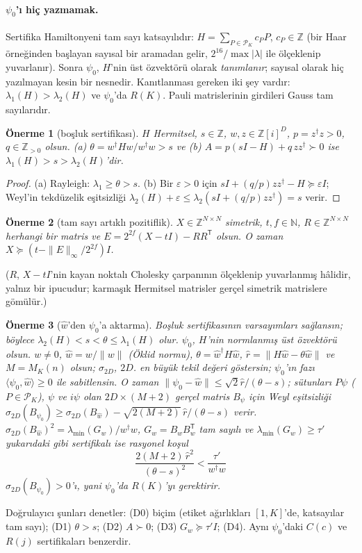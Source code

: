 \documentclass[aps,pra,onecolumn,superscriptaddress,nofootinbib,longbibliography,10pt]{revtex4-2}
\newtheorem{proposition}{Önerme}[section]
\theoremstyle{definition}
\newcommand{\ZZ}{\mathbb Z}
\begin{document}
\paragraph*{$\psi_0$'ı hiç yazmamak.} Sertifika Hamiltonyeni tam sayı katsayılıdır: $H=\sum_{P\in\mathcal P_K}c_PP$, $c_P\in\ZZ$ (bir Haar örneğinden başlayan sayısal bir aramadan gelir, $2^{16}/\max|\lambda|$ ile ölçeklenip yuvarlanır). Sonra $\psi_0$, $H$'nin üst özvektörü olarak \emph{tanımlanır}; sayısal olarak hiç yazılmayan kesin bir nesnedir. Kanıtlanması gereken iki şey vardır: $\lambda_1(H)>\lambda_2(H)$ ve $\psi_0$'da $R(K)$. Pauli matrislerinin girdileri Gauss tam sayılarıdır.

\begin{proposition}[boşluk sertifikası]
$H$ Hermitsel, $s\in\ZZ$, $w,z\in\ZZ[i]^D$, $p=z^\dagger z>0$, $q\in\ZZ_{>0}$ olsun. (a) $\theta=w^\dagger Hw/w^\dagger w>s$ ve (b) $A=p(sI-H)+q\,zz^\dagger\succ0$ ise $\lambda_1(H)>s>\lambda_2(H)$'dir.
\end{proposition}
\begin{proof}
(a) Rayleigh: $\lambda_1\ge\theta>s$. (b) Bir $\varepsilon>0$ için $sI+(q/p)zz^\dagger-H\succeq\varepsilon I$; Weyl'in tekdüzelik eşitsizliği $\lambda_2(H)+\varepsilon\le\lambda_2(sI+(q/p)zz^\dagger)=s$ verir.
\end{proof}
\begin{proposition}[tam sayı artıklı pozitiflik]
$X\in\ZZ^{N\times N}$ simetrik, $t,f\in\mathbb N$, $R\in\ZZ^{N\times N}$ herhangi bir matris ve $E=2^{2f}(X-tI)-RR^{\mathsf T}$ olsun. O zaman $X\succeq(t-\|E\|_\infty/2^{2f})I$.
\end{proposition}
\noindent ($R$, $X-tI$'nin kayan noktalı Cholesky çarpanının ölçeklenip yuvarlanmış hâlidir, yalnız bir ipucudur; karmaşık Hermitsel matrisler gerçel simetrik matrislere gömülür.)
\begin{proposition}[$\hat w$'den $\psi_0$'a aktarma]
Boşluk sertifikasının varsayımları sağlansın; böylece $\lambda_2(H)<s<\theta\le\lambda_1(H)$ olur. $\psi_0$, $H$'nin normlanmış üst özvektörü olsun. $w\ne0$, $\hat w=w/\|w\|$ (Öklid normu), $\theta=\hat w^\dagger H\hat w$, $\hat r=\|H\hat w-\theta\hat w\|$ ve $M=M_K(n)$ olsun; $\sigma_{2D}$, $2D$. en büyük tekil değeri göstersin; $\psi_0$'ın fazı $\langle\psi_0,\hat w\rangle\ge0$ ile sabitlensin. O zaman $\|\psi_0-\hat w\|\le\sqrt2\hat r/(\theta-s)$; sütunları $P\psi$ ($P\in\mathcal P_K$), $\psi$ ve $i\psi$ olan $2D\times(M+2)$ gerçel matris $B_\psi$ için Weyl eşitsizliği $\sigma_{2D}(B_{\psi_0})\ge\sigma_{2D}(B_{\hat w})-\sqrt{2(M+2)}\,\hat r/(\theta-s)$ verir. $\sigma_{2D}(B_{\hat w})^2=\lambda_{\min}(G_w)/w^\dagger w$, $G_w=B_wB_w^{\mathsf T}$ tam sayılı ve $\lambda_{\min}(G_w)\ge\tau'$ yukarıdaki gibi sertifikalı ise rasyonel koşul
\[
\frac{2(M+2)\,\hat r^2}{(\theta-s)^2}<\frac{\tau'}{w^\dagger w}\tag{D4}
\]
$\sigma_{2D}(B_{\psi_0})>0$'ı, yani $\psi_0$'da $R(K)$'yı gerektirir.
\end{proposition}
\noindent Doğrulayıcı şunları denetler: (D0) biçim (etiket ağırlıkları $[1,K]$'de, katsayılar tam sayı); (D1) $\theta>s$; (D2) $A\succ0$; (D3) $G_w\succeq\tau'I$; (D4). Aynı $\psi_0$'daki $C(c)$ ve $R(j)$ sertifikaları benzerdir.
\end{document}
